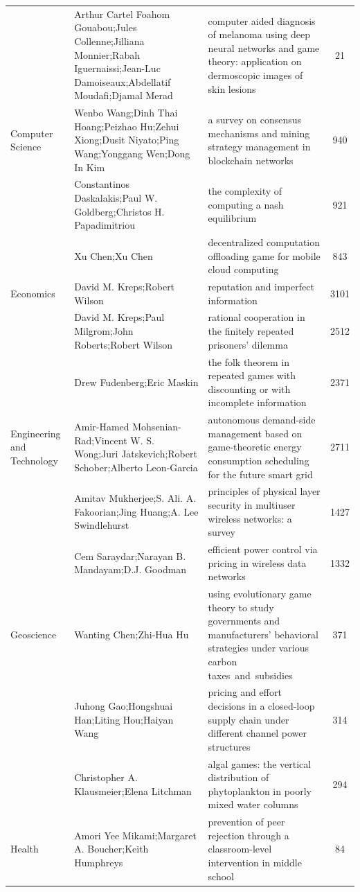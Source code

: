 \documentclass[
  12pt,
]{article}
\begin{document}
\begin{longtable}[t]{|>{\raggedright\arraybackslash}p{4cm}>{\raggedright\arraybackslash}p{4cm}>{\raggedright\arraybackslash}p{4cm}>{}c|}
 & Arthur Cartel Foahom Gouabou;Jules Collenne;Jilliana Monnier;Rabah Iguernaissi;Jean-Luc Damoiseaux;Abdellatif Moudafi;Djamal Merad & computer aided diagnosis of melanoma using deep neural networks and game theory: application on dermoscopic images of skin lesions & 21\\
Computer Science & Wenbo Wang;Dinh Thai Hoang;Peizhao Hu;Zehui Xiong;Dusit Niyato;Ping Wang;Yonggang Wen;Dong In Kim & a survey on consensus mechanisms and mining strategy management in blockchain networks & 940\\
 & Constantinos Daskalakis;Paul W. Goldberg;Christos H. Papadimitriou & the complexity of computing a nash equilibrium & 921\\
 & Xu Chen;Xu Chen & decentralized computation offloading game for mobile cloud computing & 843\\
Economics & David M. Kreps;Robert Wilson & reputation and imperfect information & 3101\\
 & David M. Kreps;Paul Milgrom;John Roberts;Robert Wilson & rational cooperation in the finitely repeated prisoners' dilemma & 2512\\
 & Drew Fudenberg;Eric Maskin & the folk theorem in repeated games with discounting or with incomplete information & 2371\\
Engineering and Technology & Amir-Hamed Mohsenian-Rad;Vincent W. S. Wong;Juri Jatskevich;Robert Schober;Alberto Leon‐Garcia & autonomous demand-side management based on game-theoretic energy consumption scheduling for the future smart grid & 2711\\
 & Amitav Mukherjee;S. Ali. A. Fakoorian;Jing Huang;A. Lee Swindlehurst & principles of physical layer security in multiuser wireless networks: a survey & 1427\\
 & Cem Saraydar;Narayan B. Mandayam;D.J. Goodman & efficient power control via pricing in wireless data networks & 1332\\
Geoscience & Wanting Chen;Zhi‐Hua Hu & using evolutionary game theory to study governments and manufacturers’ behavioral strategies under various carbon taxes and subsidies & 371\\
 & Juhong Gao;Hongshuai Han;Liting Hou;Haiyan Wang & pricing and effort decisions in a closed-loop supply chain under different channel power structures & 314\\
 & Christopher A. Klausmeier;Elena Litchman & algal games: the vertical distribution of phytoplankton in poorly mixed water columns & 294\\
Health & Amori Yee Mikami;Margaret A. Boucher;Keith Humphreys & prevention of peer rejection through a classroom-level intervention in middle school & 84\\

\end{longtable}
\end{document}
